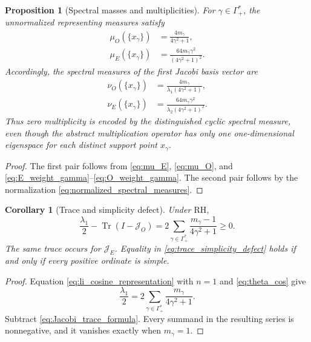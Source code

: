 \documentclass[preprint,12pt]{elsarticle}
\numberwithin{equation}{section}
\theoremstyle{plain}
\newtheorem{proposition}[theorem]{Proposition}
\newtheorem{corollary}[theorem]{Corollary}
\theoremstyle{definition}
\theoremstyle{remark}
\newcommand{\RH}{\mathrm{RH}}
\begin{document}
\begin{proposition}[Spectral masses and multiplicities]
\label{prop:spectral_multiplicity_weights}
For $\gamma\in\Gamma_+^*$, the unnormalized representing measures satisfy
\begin{align}
\mu_O(\{x_\gamma\})
&=\frac{4m_\gamma}{4\gamma^2+1},
\label{eq:muO_atom_mass}\\
\mu_E(\{x_\gamma\})
&=\frac{64m_\gamma\gamma^2}{(4\gamma^2+1)^2}.
\label{eq:muE_atom_mass}
\end{align}
Accordingly, the spectral measures of the first Jacobi basis vector are
\begin{align}
\nu_O(\{x_\gamma\})
&=\frac{4m_\gamma}{\lambda_1(4\gamma^2+1)},
\label{eq:nuO_atom_mass}\\
\nu_E(\{x_\gamma\})
&=\frac{64m_\gamma\gamma^2}{\lambda_2(4\gamma^2+1)^2}.
\label{eq:nuE_atom_mass}
\end{align}
Thus zero multiplicity is encoded by the distinguished cyclic spectral measure, even though the abstract multiplication operator has only one one-dimensional eigenspace for each distinct support point $x_\gamma$.
\end{proposition}

\begin{proof}
The first pair follows from \eqref{eq:mu_E}, \eqref{eq:mu_O}, and \eqref{eq:E_weight_gamma}--\eqref{eq:O_weight_gamma}. The second pair follows by the normalization \eqref{eq:normalized_spectral_measures}.
\end{proof}

\begin{corollary}[Trace and simplicity defect]
\label{cor:trace_simplicity_defect}
Under $\RH$,
\begin{equation}
\frac{\lambda_1}{2}
-
\operatorname{Tr}(I-\mathcal J_O)
=
2\sum_{\gamma\in\Gamma_+^*}
\frac{m_\gamma-1}{4\gamma^2+1}
\ge0.
\label{eq:trace_simplicity_defect}
\end{equation}
The same trace occurs for $\mathcal J_E$. Equality in \eqref{eq:trace_simplicity_defect} holds if and only if every positive ordinate is simple.
\end{corollary}

\begin{proof}
Equation \eqref{eq:li_cosine_representation} with $n=1$ and \eqref{eq:theta_cos} give
\begin{equation}
\frac{\lambda_1}{2}
=2\sum_{\gamma\in\Gamma_+^*}\frac{m_\gamma}{4\gamma^2+1}.
\label{eq:lambda1_multiplicity_sum}
\end{equation}
Subtract \eqref{eq:Jacobi_trace_formula}. Every summand in the resulting series is nonnegative, and it vanishes exactly when $m_\gamma=1$.
\end{proof}
\end{document}
